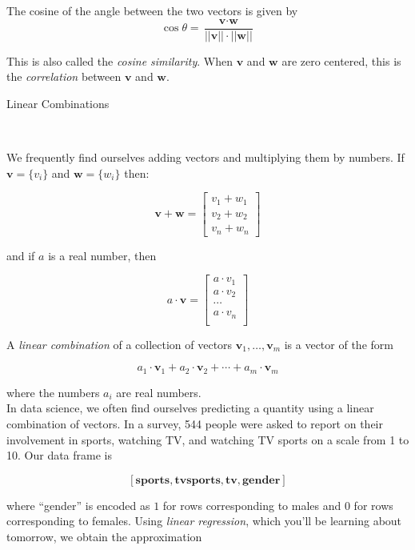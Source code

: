 \documentclass{article}
\begin{document}
\noindent The cosine of the angle between the two vectors is given by
\[  \cos{\theta} = \frac{\textbf{v} \cdot \textbf{w}}{||\textbf{v}||\cdot||\textbf{w}||}\] 

This is also called the \emph{cosine similarity}. When $\textbf{v}$ and $\textbf{w}$ are zero centered, this is  the \emph{correlation} between $\textbf{v}$ and $\textbf{w}$.\\

\centerline{\sc \large Linear Combinations}\

We frequently find ourselves adding vectors and multiplying them by numbers. If $\textbf{v} = \{v_i\}$ and $\textbf{w} = \{w_i\}$ then:

\[ \textbf{v} + \textbf{w} = \left[ \begin{array}{c}
v_{1} + w_{1} \\
v_{2} + w_{2} \\
v_{n} + w_{n}
 \end{array} \right]\] 

and if $a$ is a real number, then

\[ a\cdot \textbf{v} =  \left[ \begin{array}{c}
a \cdot v_{1}  \\
a \cdot v_{2} \\
\cdots \\
a \cdot v_{n} \\
 \end{array} \right]\] 

A \emph{linear combination} of a collection of vectors $\textbf{v}_1, \ldots, \textbf{v}_m$ is a vector of the form

\[  a_1 \cdot \textbf{v}_1 +  a_2 \cdot \textbf{v}_2 + \cdots + a_m \cdot \textbf{v}_m \] 

where the numbers $a_i$ are real numbers.\\



In data science, we often find ourselves predicting a quantity using a linear combination of vectors. In a survey, 544 people were asked to report on their involvement in sports, watching TV, and watching TV sports on a scale from 1 to 10. Our data frame is

\[ [ \textbf{sports}, \textbf{tvsports}, \textbf{tv}, \textbf{gender} ] \]

\noindent where ``gender'' is encoded as $1$ for rows corresponding to males and $0$ for rows corresponding to females. Using \emph{linear regression}, which you'll be learning about tomorrow, we obtain the approximation
\end{document}
